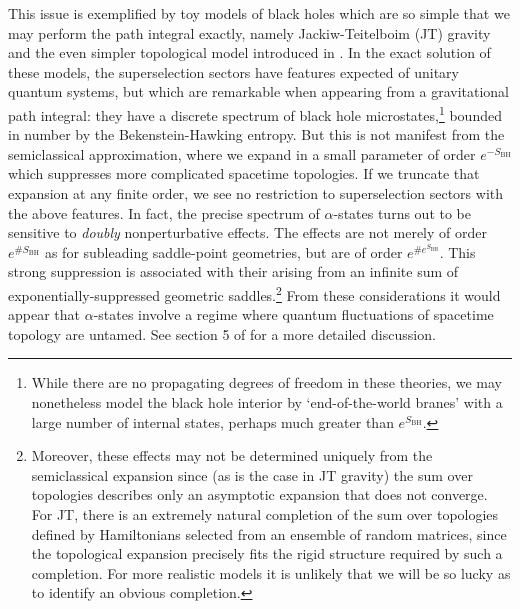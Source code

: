 \documentclass[letterpaper,12pt]{article}
\begin{document}
This issue is exemplified by toy models of black holes which are so simple that we may perform the path integral exactly, namely Jackiw-Teitelboim (JT) gravity \cite{Saad:2019lba,Penington:2019kki} and the even simpler topological model introduced in \cite{Marolf:2020xie}. In the exact solution of these models, the superselection sectors have features expected of unitary quantum systems, but which are remarkable when appearing from a gravitational path integral: they have a discrete spectrum of black hole microstates,\footnote{While there are no propagating degrees of freedom in these theories, we may nonetheless model the black hole interior by `end-of-the-world branes' with a large number of internal states, perhaps much greater than $e^{S_\mathrm{BH}}$.} bounded in number by the Bekenstein-Hawking entropy. But this is not manifest from the semiclassical approximation, where we expand in a small parameter of order $e^{-S_\mathrm{BH}}$ which suppresses more complicated spacetime topologies. If we truncate that expansion at any finite order, we see no restriction to superselection sectors with the above features. In fact, the precise spectrum of $\alpha$-states turns out to be sensitive to \emph{doubly} nonperturbative effects.  The effects are not merely of order $e^{\# S_\mathrm{BH}}$ as for subleading saddle-point geometries, but are of order $e^{\# e^{S_\mathrm{BH}}}$.  This strong suppression is associated with their arising from an infinite sum of exponentially-suppressed geometric saddles.\footnote{Moreover, these effects may not be determined uniquely from the semiclassical expansion since (as is the case in JT gravity) the sum over topologies describes only an asymptotic expansion that does not converge. For JT, there is an extremely natural completion of the sum over topologies defined by Hamiltonians selected from an ensemble of random matrices, since the topological expansion precisely fits the rigid structure required by such a completion. For more realistic models it is unlikely that we will be so lucky as to identify an obvious completion.} From these considerations it would appear that $\alpha$-states involve a regime where quantum fluctuations of spacetime topology are untamed. See section 5 of \cite{Marolf:2020xie} for a more detailed discussion.
\end{document}
